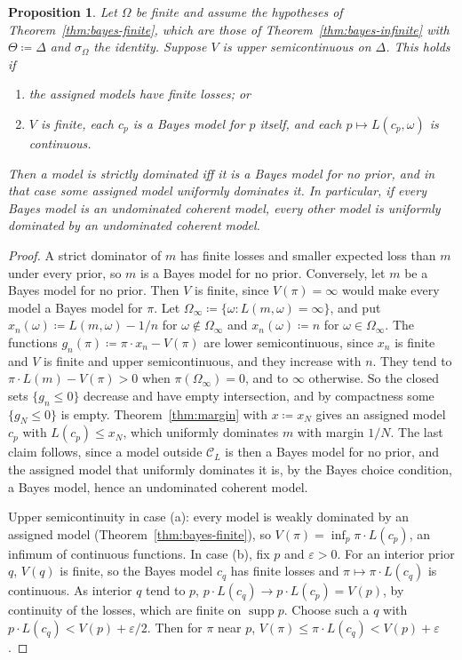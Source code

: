\documentclass[11pt]{article}
\newtheorem{proposition}[theorem]{Proposition}
\theoremstyle{definition}
\theoremstyle{remark}
\newcommand{\C}{\mathcal C}
\newcommand{\supp}{\operatorname{supp}}
\begin{document}
\begin{proposition}\label{prop:strict}
Let $\Omega$ be finite and assume the hypotheses of Theorem~\ref{thm:bayes-finite}, which are those of Theorem~\ref{thm:bayes-infinite} with $\Theta\coloneqq\Delta$ and $\sigma_\Omega$ the identity. Suppose $V$ is upper semicontinuous on $\Delta$. This holds if
\begin{enumerate}[label=(\alph*)]
\item the assigned models have finite losses; or
\item $V$ is finite, each $c_p$ is a Bayes model for $p$ itself, and each $p\mapsto L(c_p,\omega)$ is continuous.
\end{enumerate}
Then a model is strictly dominated iff it is a Bayes model for no prior, and in that case some assigned model uniformly dominates it. In particular, if every Bayes model is an undominated coherent model, every other model is uniformly dominated by an undominated coherent model.
\end{proposition}
\begin{proof}
A strict dominator of $m$ has finite losses and smaller expected loss than $m$ under every prior, so $m$ is a Bayes model for no prior. Conversely, let $m$ be a Bayes model for no prior. Then $V$ is finite, since $V(\pi)=\infty$ would make every model a Bayes model for $\pi$. Let $\Omega_\infty\coloneqq\{\omega:L(m,\omega)=\infty\}$, and put $x_n(\omega)\coloneqq L(m,\omega)-1/n$ for $\omega\notin\Omega_\infty$ and $x_n(\omega)\coloneqq n$ for $\omega\in\Omega_\infty$. The functions $g_n(\pi)\coloneqq\pi\cdot x_n-V(\pi)$ are lower semicontinuous, since $x_n$ is finite and $V$ is finite and upper semicontinuous, and they increase with $n$. They tend to $\pi\cdot L(m)-V(\pi)>0$ when $\pi(\Omega_\infty)=0$, and to $\infty$ otherwise. So the closed sets $\{g_n\le0\}$ decrease and have empty intersection, and by compactness some $\{g_N\le0\}$ is empty. Theorem~\ref{thm:margin} with $x\coloneqq x_N$ gives an assigned model $c_p$ with $L(c_p)\le x_N$, which uniformly dominates $m$ with margin $1/N$. The last claim follows, since a model outside $\C_L$ is then a Bayes model for no prior, and the assigned model that uniformly dominates it is, by the Bayes choice condition, a Bayes model, hence an undominated coherent model.

Upper semicontinuity in case (a): every model is weakly dominated by an assigned model (Theorem~\ref{thm:bayes-finite}), so $V(\pi)=\inf_p\pi\cdot L(c_p)$, an infimum of continuous functions. In case (b), fix $p$ and $\varepsilon>0$. For an interior prior $q$, $V(q)$ is finite, so the Bayes model $c_q$ has finite losses and $\pi\mapsto\pi\cdot L(c_q)$ is continuous. As interior $q$ tend to $p$, $p\cdot L(c_q)\to p\cdot L(c_p)=V(p)$, by continuity of the losses, which are finite on $\supp p$. Choose such a $q$ with $p\cdot L(c_q)<V(p)+\varepsilon/2$. Then for $\pi$ near $p$, $V(\pi)\le\pi\cdot L(c_q)<V(p)+\varepsilon$.
\end{proof}
\end{document}
